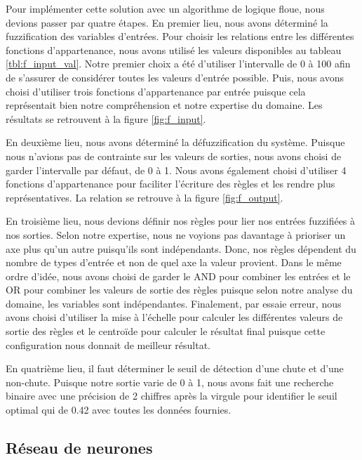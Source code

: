 \documentclass[12pt,letterpaper]{article}
\begin{document}

Pour implémenter cette solution avec un algorithme de logique floue, nous devions passer par quatre étapes. En premier lieu, nous avons déterminé la fuzzification des variables d'entrées. Pour choisir les relations entre les différentes fonctions d'appartenance, nous avons utilisé les valeurs disponibles au tableau \ref{tbl:f_input_val}. Notre premier choix a été d'utiliser l'intervalle de 0 à 100 afin de s'assurer de considérer toutes les valeurs d'entrée possible. Puis, nous avons choisi d'utiliser trois fonctions d'appartenance par entrée puisque cela représentait bien notre compréhension et notre expertise du domaine. Les résultats se retrouvent à la figure \ref{fig:f_input}.

En deuxième lieu, nous avons déterminé la défuzzification du système. Puisque nous n'avions pas de contrainte sur les valeurs de sorties, nous avons choisi de garder l'intervalle par défaut, de 0 à 1. Nous avons également choisi d'utiliser 4 fonctions d'appartenance pour faciliter l'écriture des règles et les rendre plus représentatives. La relation se retrouve à la figure \ref{fig:f_output}.

En troisième lieu, nous devions définir nos règles pour lier nos entrées fuzzifiées à nos sorties. Selon notre expertise, nous ne voyions pas davantage à prioriser un axe plus qu'un autre puisqu'ils sont indépendants. Donc, nos règles dépendent du nombre de types d'entrée et non de quel axe la valeur provient. Dans le même ordre d'idée, nous avons choisi de garder le AND pour combiner les entrées et le OR pour combiner les valeurs de sortie des règles puisque selon notre analyse du domaine, les variables sont indépendantes. Finalement, par essaie erreur, nous avons choisi d'utiliser la mise à l'échelle pour calculer les différentes valeurs de sortie des règles et le centroïde pour calculer le résultat final puisque cette configuration nous donnait de meilleur résultat.

En quatrième lieu, il faut déterminer le seuil de détection d'une chute et d'une non-chute. Puisque notre sortie varie de 0 à 1, nous avons fait une recherche binaire avec une précision de 2 chiffres après la virgule pour identifier le seuil optimal qui de 0.42 avec toutes les données fournies.

\subsection{Réseau de neurones} %
\end{document}
